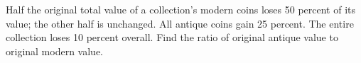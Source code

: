 Half the original total value of a collection's modern coins loses 50 percent of its value; the other half is unchanged. All antique coins gain 25 percent. The entire collection loses 10 percent overall. Find the ratio of original antique value to original modern value.
